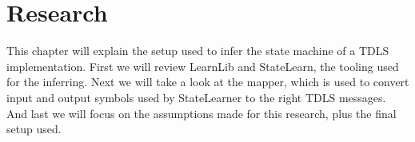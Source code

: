 \chapter{Research}\label{research}

This chapter will explain the setup used to infer the state machine of a TDLS implementation.
First we will review LearnLib and StateLearn, the tooling used for the inferring. Next we will take a look at the mapper, which is used to convert input and output symbols used by StateLearner to the right TDLS messages. And last we will focus on the assumptions made for this research, plus the final setup used.




